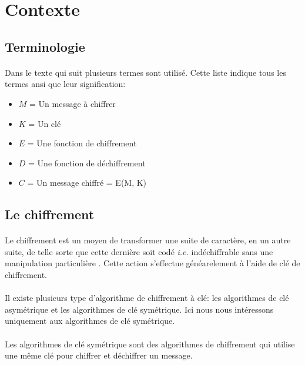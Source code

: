 \documentclass[letterpaper]{article}
\begin{document}

\section{Contexte}

\subsection{Terminologie}

\paragraph{}
Dans le texte qui suit plusieurs termes sont utilisé. Cette liste indique tous les termes
ansi que leur signification:

\begin{itemize}
    \item $M$ = Un message à chiffrer
    \item $K$ = Un clé
    \item $E$ = Une fonction de chiffrement
    \item $D$ = Une fonction de déchiffrement
    \item $C$ = Un message chiffré = E(M, K)
\end{itemize}

\subsection{Le chiffrement}

\paragraph{}
Le chiffrement est un moyen de transformer une suite de caractère, en un autre suite, de telle sorte
que cette dernière soit codé \textit{i.e.} indéchiffrable sans une manipulation particulière \cite{MCEE}.
Cette action s'effectue généarelement à l'aide de clé de chiffrement. 
\paragraph{}
Il existe plusieurs type d'algorithme de chiffrement à clé: les algorithmes de clé asymétrique et les algorithmes de clé symétrique. Ici nous nous intéressons uniquement aux algorithmes de clé symétrique.
\paragraph{}
Les algorithmes de clé symétrique sont des algorithmes de chiffrement qui utilise une même clé pour chiffrer et déchiffrer un message.
\end{document}
